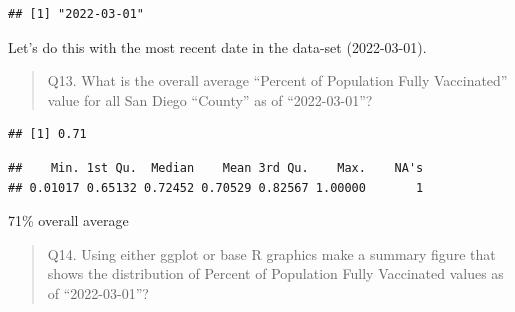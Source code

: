 \documentclass[
]{article}
\newenvironment{Shaded}{\begin{snugshade}}{\end{snugshade}}
\newcommand{\AttributeTok}[1]{\textcolor[rgb]{0.77,0.63,0.00}{#1}}
\newcommand{\CommentTok}[1]{\textcolor[rgb]{0.56,0.35,0.01}{\textit{#1}}}
\newcommand{\ConstantTok}[1]{\textcolor[rgb]{0.00,0.00,0.00}{#1}}
\newcommand{\DecValTok}[1]{\textcolor[rgb]{0.00,0.00,0.81}{#1}}
\newcommand{\FunctionTok}[1]{\textcolor[rgb]{0.00,0.00,0.00}{#1}}
\newcommand{\NormalTok}[1]{#1}
\newcommand{\OtherTok}[1]{\textcolor[rgb]{0.56,0.35,0.01}{#1}}
\newcommand{\SpecialCharTok}[1]{\textcolor[rgb]{0.00,0.00,0.00}{#1}}
\newcommand{\StringTok}[1]{\textcolor[rgb]{0.31,0.60,0.02}{#1}}
\begin{document}
\begin{verbatim}
## [1] "2022-03-01"
\end{verbatim}

Let's do this with the most recent date in the data-set (2022-03-01).

\begin{quote}
Q13. What is the overall average ``Percent of Population Fully
Vaccinated'' value for all San Diego ``County'' as of ``2022-03-01''?
\end{quote}

\begin{Shaded}
\end{Shaded}

\begin{verbatim}
## [1] 0.71
\end{verbatim}

\begin{Shaded}
\end{Shaded}

\begin{verbatim}
##    Min. 1st Qu.  Median    Mean 3rd Qu.    Max.    NA's 
## 0.01017 0.65132 0.72452 0.70529 0.82567 1.00000       1
\end{verbatim}

71\% overall average

\begin{quote}
Q14. Using either ggplot or base R graphics make a summary figure that
shows the distribution of Percent of Population Fully Vaccinated values
as of ``2022-03-01''?
\end{quote}

\begin{Shaded}
\end{Shaded}
\end{document}
